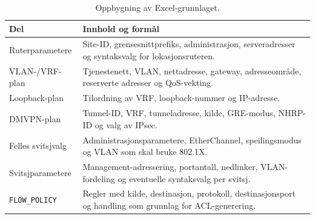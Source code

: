 \begin{table}[H]
    \centering
    \caption{Oppbygning av Excel-grunnlaget.}
    \label{tab:excel-struktur}
    \small
    \renewcommand{\arraystretch}{1.35}
    \setlength{\tabcolsep}{5pt}
    \begin{tabular}{
        >{\raggedright\arraybackslash}p{3.2cm}
        >{\raggedright\arraybackslash}p{11.6cm}
    }
        \toprule
        \rowcolor{tablegreen}
        \color{white}\textbf{Del} &
        \color{white}\textbf{Innhold og formål} \\
        \midrule
        Ruterparametere &
        Site-ID, grensesnittprefiks, administrasjon, serveradresser og syntaksvalg for lokasjonsruteren. \\
        VLAN-/VRF-plan &
        Tjenestenett, VLAN, nettadresse, gateway, adresseområde, reserverte adresser og QoS-vekting. \\
        Loopback-plan &
        Tilordning av VRF, loopback-nummer og IP-adresse. \\
        DMVPN-plan &
        Tunnel-ID, VRF, tunneladresse, kilde, GRE-modus, NHRP-ID og valg av IPsec. \\
        Felles svitsjvalg &
        Administrasjonsparametere, EtherChannel, speilingsmodus og VLAN som skal bruke 802.1X. \\
        Svitsjparametere &
        Management-adressering, portantall, nedlinker, VLAN-fordeling og eventuelle syntaksvalg per svitsj. \\
        \texttt{FLOW\_POLICY} &
        Regler med kilde, destinasjon, protokoll, destinasjonsport og handling som grunnlag for ACL-generering. \\
        \bottomrule
    \end{tabular}
\end{table}

